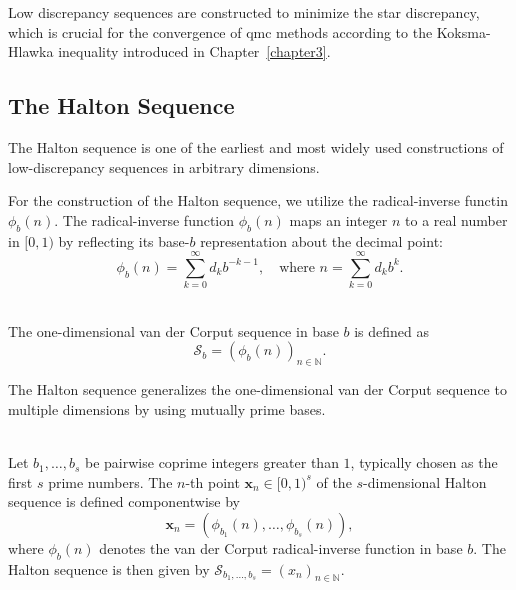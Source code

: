 Low discrepancy sequences are constructed to minimize the star
discrepancy, which is crucial for the convergence of \ac{qmc} methods according to the Koksma-Hlawka inequality introduced in Chapter~\ref{chapter3}.

\subsection{The Halton Sequence}
\label{subsec:halton-sequence}

The Halton sequence is one of the earliest and most widely used constructions of
low-discrepancy sequences in arbitrary dimensions. 

For the construction of the Halton sequence, we utilize the radical-inverse
functin $\phi_b(n)$. The radical-inverse function $\phi_b(n)$ maps an integer
$n$ to a real number in $[0,1)$ by reflecting its base-$b$ representation about
the decimal point:
\begin{equation*}
    \phi_b(n) = \sum_{k=0}^\infty d_k b^{-k-1}, \quad \text{where } n = \sum_
    {k=0}^\infty d_k b^k.
\end{equation*}

\begin{definition} \ \\
\label{def:van-der-corput-sequence}
The one-dimensional van der Corput sequence in base $b$ is defined as
\begin{equation*}
    \mathcal{S}_b = \left( \phi_b(n) \right)_{n\in \mathbb{N}}.
\end{equation*}
\end{definition}

The Halton sequence generalizes the one-dimensional van der Corput sequence to
multiple dimensions by using mutually prime bases.

\begin{definition} \ \\
Let $b_1, \dots, b_s$ be pairwise coprime integers greater than $1$, typically
chosen as the first $s$ prime numbers. The $n$-th point $\boldsymbol{x}_n \in
[0,1)^s$ of the $s$-dimensional Halton sequence is defined componentwise by
\begin{equation*}
    \boldsymbol{x}_n = \left( \phi_{b_1}(n), \dots, \phi_{b_s}(n) \right),
\end{equation*}
where $\phi_b(n)$ denotes the van der Corput radical-inverse function in base
$b$. The Halton sequence is then given by $\mathcal{S}_{b_1, \dots, b_s} = (x_n)_{n\in \mathbb{N}}$.
\end{definition}

